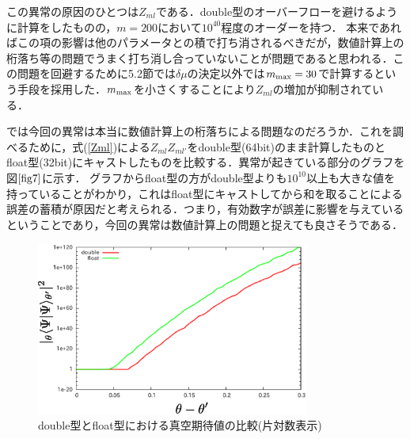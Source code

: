 \documentclass[10.5pt,a4paper]{jreport}
\def\theequation{\thechapter.\arabic{equation}}
\begin{document}
この異常の原因のひとつは$Z_{ml}$である．double型のオーバーフローを避けるように計算をしたものの，$m=200$において$10^{40}$程度のオーダーを持つ．
本来であればこの項の影響は他のパラメータとの積で打ち消されるべきだが，数値計算上の桁落ち等の問題でうまく打ち消し合っていないことが問題であると思われる．この問題を回避するために5.2節では$\delta \mu$の決定以外では$m_{\rm max}=30$で計算するという手段を採用した．$m_{\rm max}$を小さくすることにより$Z_{ml}$の増加が抑制されている．

では今回の異常は本当に数値計算上の桁落ちによる問題なのだろうか．これを調べるために，式(\ref{Zml})による$Z_{ml}Z_{ml'}$をdouble型(64bit)のまま計算したものとfloat型(32bit)にキャストしたものを比較する．異常が起きている部分のグラフを図$\ref{fig7}$に示す．
グラフからfloat型の方がdouble型よりも$10^{10}$以上も大きな値を持っていることがわかり，これはfloat型にキャストしてから和を取ることによる誤差の蓄積が原因だと考えられる．つまり，有効数字が誤差に影響を与えているということであり，今回の異常は数値計算上の問題と捉えても良さそうである．
\begin{figure}[htbp]
  \centering
  \includegraphics[width = 9cm]{./EPS/fig7.eps}
  \caption{double型とfloat型における真空期待値の比較(片対数表示)}
  \label{fig7}
\end{figure}

\renewcommand{\theequation}{\thechapter.\arabic{equation}}
\newpage
\end{document}
